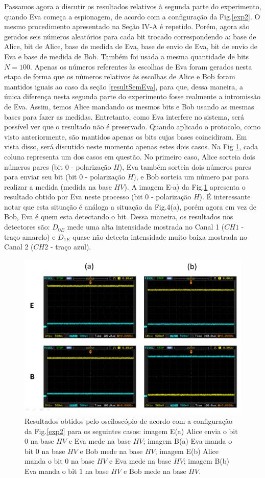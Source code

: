 \documentclass[pra, twocolumn]{revtex4}
\begin{document}
Passamos agora a discutir os resultados relativos \`a segunda parte do experimento, quando Eva come\c ca a espionagem, de acordo com a configura\c c\~ao da Fig.\ref{exp2}. O mesmo procedimento apresentado na Se\c c\~ao IV-A \'e repetido. Por\'em, agora s\~ao gerados seis n\'umeros aleat\'orios para cada bit trocado correspondendo a: base de Alice, bit de Alice, base de medida de Eva, base de envio de Eva, bit de envio de Eva e base de medida de Bob. Tamb\'em foi usada a mesma quantidade de bits $N=100$. Apenas os n\'umeros referentes \`as escolhas de Eva foram gerados nesta etapa de forma que os n\'umeros relativos \`as escolhas de Alice e Bob foram mantidos iguais ao caso da se\c c\~ao \ref{resultSemEva}, para que, dessa maneira, a \'unica diferen\c ca nesta segunda parte do experimento fosse realmente a intromiss\~ao de Eva. Assim, temos Alice mandando os mesmos bits e Bob usando as mesmas bases para fazer as medidas. Entretanto, como Eva interfere no sistema, ser\'a poss\'ivel ver que o resultado n\~ao \'e preservado. Quando aplicado o protocolo, como visto anteriormente, s\~ao mantidos apenas os bits cujas bases coincidiram. Em vista disso, ser\'a discutido neste momento apenas estes dois casos. Na Fig \ref{imagem2}, cada coluna representa um dos casos em quest\~ao. No primeiro caso, Alice sorteia dois n\'umeros pares (bit $0$ - polariza\c c\~ao $H$), Eva tamb\'em sorteia dois n\'umeros pares para enviar seu bit  (bit $0$ - polariza\c c\~ao $H$), e Bob sorteia um n\'umero par para realizar a medida (medida na base $HV$). A imagem E-a) da Fig.\ref{imagem2} apresenta o resultado obtido por Eva neste processo (bit $0$ - polariza\c c\~ao $H$). \'E interessante notar que esta situa\c c\~ao \'e an\'aloga a situa\c c\~ao da Fig.4(a), por\'em agora em vez de Bob, Eva \'e quem esta detectando o bit. Dessa maneira, os resultados nos detectores s\~ao: $D_{0E}$ mede uma alta intensidade mostrada no Canal 1 ($CH1$ - tra\c co amarelo) e $D_{1E}$ quase n\~ao detecta intensidade muito baixa mostrada no Canal 2 ($CH2$ - tra\c co azul).

\begin{figure} [H]
     \centering
     \includegraphics[scale=0.55, trim=0.7cm 0cm 0.7cm 0cm, clip=true,width =8.0 cm, height=5.5 cm]{fig5.jpg}
     \caption{Resultados obtidos pelo oscilosc\'opio de acordo com a configura\c c\~ao da Fig.\ref{exp2} para os seguintes casos: imagem E(a) Alice envia o bit $0$ na base $HV$ e Eva mede na base $HV$; imagem B(a) Eva manda o bit $0$ na base $HV$ e Bob mede na base $HV$; imagem E(b) Alice manda o bit $0$ na base $HV$ e Eva mede na base $HV$; imagem B(b) Eva manda o bit $1$ na base $HV$ e Bob mede na base $HV$.}
     \label{imagem2}
\end{figure}
\end{document}
